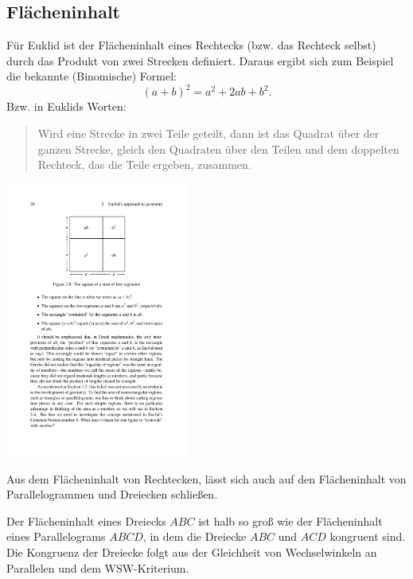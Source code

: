 \subsection*{Flächeninhalt}

Für Euklid ist der Flächeninhalt eines Rechtecks (bzw. das Rechteck
selbst) durch das Produkt von zwei Strecken definiert.
Daraus ergibt sich zum Beispiel die bekannte (Binomische) Formel:
$$
(a+b)^2=a^2+2ab+b^2
.
$$
Bzw. in Euklids Worten:
\begin{quote}
Wird eine Strecke in zwei Teile geteilt, dann ist das Quadrat über der
ganzen Strecke, gleich den Quadraten über den Teilen und dem doppelten
Rechteck, das die Teile ergeben, zusammen.
\end{quote}



\centerline{\includegraphics[width=6cm]{BILDER/BildBinomischeFormel.pdf}}



Aus dem Flächeninhalt von Rechtecken, lässt sich auch auf den
Flächeninhalt von Parallelogrammen und Dreiecken schließen. 



Der Flächeninhalt eines Dreiecks $ABC$ ist halb so groß wie der
Flächeninhalt eines Parallelograms $ABCD$, in dem die
Dreiecke $ABC$ und $ACD$ kongruent sind.
Die Kongruenz der Dreiecke folgt aus der Gleichheit von Wechselwinkeln
an Parallelen und dem WSW-Kriterium.

